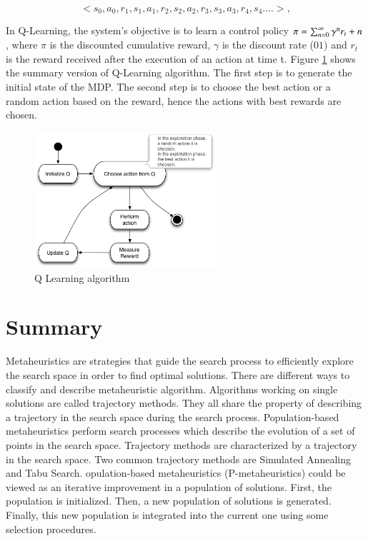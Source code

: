 \documentclass[espaco=umemeio,chapter=TITLE,twoside,openright]{abnt}
\begin{document}
\begin{equation}
<s_{0},a_{0},r_{1},s_{1},a_{1},r_{2},s_{2},a_{2},r_{3},s_{3},a_{3},r_{4},s_{4}....>,
\end{equation}


In Q-Learning, the system's objective is to learn a control policy $\pi = \sum_{n=0}^{\infty} \gamma\textsuperscript{n}  r_{t}+n $, where $\pi$  is the discounted cumulative reward, $\gamma$ is the discount rate ($01$) and $r_{t}$ is the reward received after  the execution of an action at time t. Figure \ref{fig:qalgo} shows the summary version of Q-Learning algorithm. The first step is to generate the initial state of the MDP. The second step is to choose the best action or a random action based on the reward, hence the actions with best rewards are chosen.

\begin{figure}[h]
\centering
\includegraphics[width=0.6\textwidth]{./images/qalgo.png}
\caption{Q Learning algorithm}
\label{fig:qalgo}
\end{figure}

\section{Summary}

Metaheuristics are strategies that guide the search process to efficiently explore the search space in order to find optimal solutions. There are different ways to classify and describe metaheuristic algorithm. Algorithms working on single solutions are called trajectory methods. They all share the property of describing a trajectory in the search space during the search process. Population-based metaheuristics perform search processes which describe the evolution of a set of points in the search space. Trajectory methods are characterized by a trajectory in the search space. Two common trajectory methods are Simulated Annealing and Tabu Search. opulation-based metaheuristics (P-metaheuristics) could be viewed as an iterative improvement in a population of solutions. First, the population is initialized. Then, a new population of solutions is generated. Finally, this new population is integrated into the current one using some selection procedures.
\end{document}
